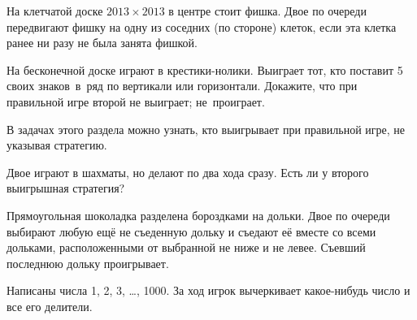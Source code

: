 \documentclass[a4paper,11pt]{article}
\begin{document}
На клетчатой доске $2013\times2013$ в центре
стоит фишка. Двое по очереди передвигают фишку на одну из соседних
(по стороне) клеток, если эта клетка ранее ни разу не была занята фишкой.

На бесконечной доске играют в крестики-нолики.
Выиграет тот, кто поставит 5 своих знаков~в~ряд
по вертикали или горизонтали.
Докажите, что при правильной игре второй
\!\!\!  \!\! не выиграет;
\!\!\!  \!\! не~проиграет.



\vspace*{-1truemm}

{\small В задачах этого раздела можно узнать, кто выигрывает
при правильной игре, не указывая %
стратегию.} %

\vspace*{1truemm}

Двое играют в шахматы, но делают
по два хода сразу.
Есть ли у второго выигрышная стратегия?


Прямоугольная шоколадка разделена бороздками на дольки.
Двое по очереди выбирают любую ещё не съеденную дольку и съедают
её вместе со всеми дольками,
расположенными от выбранной не ниже и не левее.
Съевший последнюю дольку проигрывает.

Написаны числа 1, 2, 3, \dots, 1000.
За ход игрок вычеркивает какое-нибудь число
и все его делители.
\end{document}
